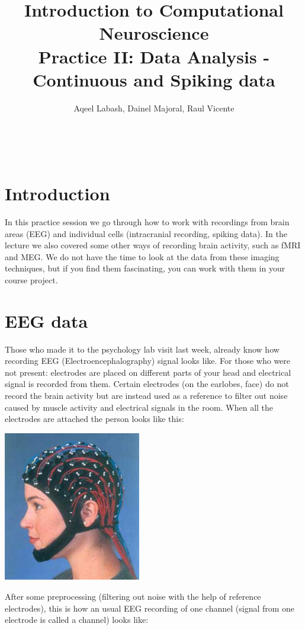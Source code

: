 \documentclass[a4paper,11pt]{article}
\author{\large{Aqeel Labash, Dainel Majoral, Raul Vicente}}
\title{\huge{Introduction to Computational Neuroscience}\\\LARGE{Practice II: Data Analysis - Continuous and Spiking data}}
\begin{document}
\maketitle
\ \\
\section{Introduction}
In this practice session we go through how to work with recordings from brain areas (EEG) and individual cells (intracranial recording, spiking data). In the lecture we also covered some other ways of recording brain activity, such as fMRI and MEG. We do not have the time to look at the data from these imaging techniques, but if you find them fascinating, you can work with them in your course project.

\section{EEG data}
Those who made it to the psychology lab visit last week, already know how recording EEG (Electroencephalography) signal looks like. For those who were not present: electrodes are placed on different parts of your head and electrical signal is recorded from them. Certain electrodes (on the earlobes, face) do not record the brain activity but are instead used as a reference to filter out noise caused by muscle activity and electrical signals in the room. When all the electrodes are attached the person looks like this:\\
\begin{center}
\includegraphics[width=6cm]{eeg.jpg}
\end{center}
After some preprocessing (filtering out noise with the help of reference electrodes), this is how an usual EEG recording of one channel (signal from one electrode is called a channel) looks like:
\end{document}
